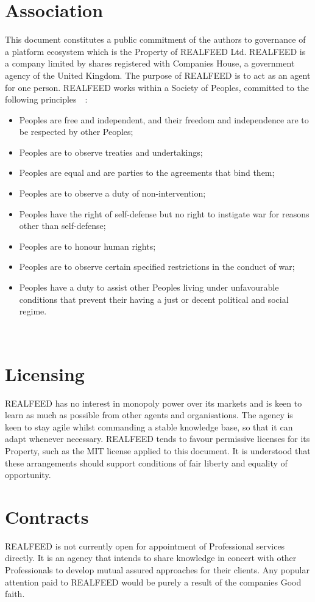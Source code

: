 \documentclass[11pt, oneside]{book}   	%
\begin{document}
\section{Association}
This document constitutes a public commitment of the authors to governance of a platform ecosystem which is the Property of REALFEED Ltd.
REALFEED is a company limited by shares registered with Companies House, a government agency of the United Kingdom.
The purpose of REALFEED is to act as an agent for one person.
REALFEED works within a Society of Peoples, committed to the following principles~\cite{jlb1}~\cite{tn1}:
\begin{itemize}
	\item Peoples are free and independent, and their freedom and independence are to be respected by other Peoples;
	\item Peoples are to observe treaties and undertakings;
	\item Peoples are equal and are parties to the agreements that bind them;
	\item Peoples are to observe a duty of non-intervention;
	\item Peoples have the right of self-defense but no right to instigate war for reasons other than self-defense;
	\item Peoples are to honour human rights;
	\item Peoples are to observe certain specified restrictions in the conduct of war;
	\item Peoples have a duty to assist other Peoples living under unfavourable conditions that prevent their having a just or decent political and social regime.
\end{itemize}\

\section{Licensing}
REALFEED has no interest in monopoly power over its markets and is keen to learn as much as possible from other agents and organisations.
The agency is keen to stay agile whilst commanding a stable knowledge base, so that it can adapt whenever necessary.
REALFEED tends to favour permissive licenses for its Property, such as the MIT license applied to this document.
It is understood that these arrangements should support conditions of fair liberty and equality of opportunity. 

\section{Contracts}
REALFEED is not currently open for appointment of Professional services directly.
It is an agency that intends to share knowledge in concert with other Professionals to develop mutual assured approaches for their clients.
Any popular attention paid to REALFEED would be purely a result of the companies Good faith.
\end{document}

